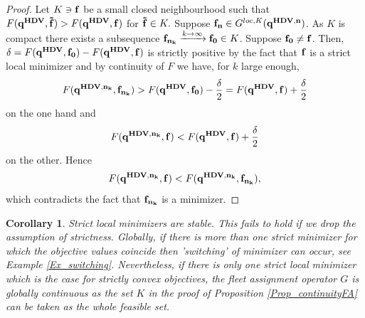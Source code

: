 \documentclass[a4paper,11pt]{article}
\newtheorem{corollary}[theorem]{Corollary}
\begin{document}
\begin{proof}
Let $K \ni \bold{f}$ be a small closed neighbourhood such that $F(\bold{q^{HDV}}, \bold{\tilde{f}}) > F(\bold{q^{HDV}},\bold{f})$ for $\bold{\tilde{f}} \in K.$ 
Suppose $\bold{f_n} \in G^{loc, K}(\bold{q^{HDV,n}})$. As $K$ is compact there exists a subsequence $\bold{f_{n_k}} \xrightarrow{k \to \infty} \bold{{f_0}} \in K$. Suppose $\bold{f_0} \neq \bold{f}$. Then, $\delta = F(\bold{q^{HDV}}, \bold{f_0}) - F(\bold{q^{HDV}}, \bold{f})$ is strictly positive by the fact that $\bold{f}$ is a strict local minimizer and by continuity of $F$ we have, for $k$ large enough, 
\begin{equation*}
F(\bold{q^{HDV, n_k}}, \bold{f_{n_k}}) > F(\bold{q^{HDV}}, \bold{f_0}) - \frac \delta 2 = F(\bold{q^{HDV}}, \bold{f}) + \frac \delta 2 
\end{equation*}
on the one hand and
\begin{equation*}
F(\bold{q^{HDV, n_k}}, \bold{f}) < F(\bold{q^{HDV}}, \bold{f}) + \frac \delta 2
\end{equation*}
on the other. Hence $$F(\bold{q^{HDV, n_k}}, \bold{f}) < F(\bold{q^{HDV, n_k}}, \bold{f_{n_k}}),$$ which contradicts the fact that $\bold{f_{n_k}}$ is a minimizer. 
\end{proof}

\begin{corollary}
Strict local minimizers are stable. This fails to hold if we drop the assumption of strictness. Globally, if there is more than one strict minimizer for which the objective values coincide then 'switching' of minimizer can occur, see Example \ref{Ex_switching}. Nevertheless, if there is only one strict local minimizer which is the case for strictly convex objectives, the fleet assignment operator $G$ is globally continuous as the set $K$ in the proof of Proposition \ref{Prop_continuityFA} can be taken as the whole feasible set. 
\end{corollary}
\end{document}
